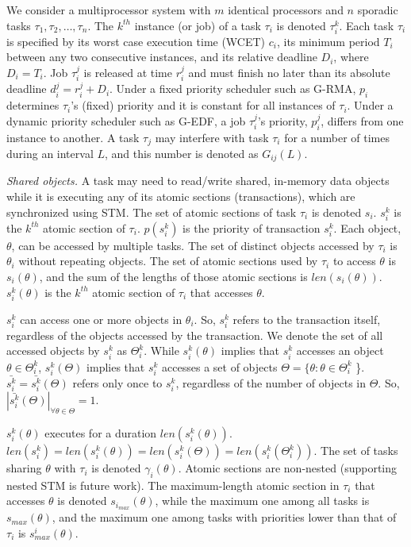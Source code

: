 \documentclass[twocolumn]{article}
\begin{document}
We consider a multiprocessor system with $m$ identical processors and $n$ sporadic tasks $\tau_1, \tau_2,\ldots, \tau_n$. The $k^{th}$ instance (or job) of a task $\tau_i$ is denoted $\tau_i^k$. Each task $\tau_i$ is specified by its worst case execution time (WCET) $c_i$, its minimum period $T_i$ between any two consecutive instances, and its relative deadline $D_i$, where $D_i=T_i$. Job $\tau_i^j$ is released at time $r_i^j$ and must finish no later than its absolute deadline $d_i^j=r_i^j+D_i$. Under a fixed priority scheduler such as G-RMA, $p_i$ determines $\tau_i$'s (fixed) priority and it is constant for all instances of $\tau_i$. Under a dynamic priority scheduler such as G-EDF, a job $\tau_i^j$'s priority, $p_i^j$, differs from one instance to another. 
A task $\tau_j$ may interfere with task $\tau_i$ for a number of times during an interval $L$, and this number is denoted as $G_{ij}(L)$. 


\textit{Shared objects.}
 A task may need to read/write shared, in-memory data objects while it is executing any of its atomic sections (transactions), which are synchronized using STM. 
The set of atomic sections of task $\tau_i$ is denoted $s_i$. $s_i^k$ is the $k^{th}$ atomic section of $\tau_i$. $p(s_i^k)$ is the priority of transaction $s_i^k$. Each object, $\theta$, can be accessed by multiple tasks. The set of distinct objects accessed by $\tau_i$ is $\theta_i$ without repeating objects.
The set of atomic sections used by $\tau_i$ to access $\theta$ is $s_i(\theta)$, and the sum of the lengths of those atomic sections is $len(s_i(\theta))$. $s_i^k(\theta)$ is the $k^{th}$ atomic section of $\tau_i$ that accesses $\theta$.

 $s_i^k$ can access one or more objects in $\theta_i$. So, $s_i^k$ refers to the transaction itself, regardless of the objects accessed by the transaction. We denote the set of all accessed objects by $s_i^k$ as $\Theta_i^k$. While $s_i^k(\theta)$ implies that $s_i^k$ accesses an object $\theta \in \Theta_i^k$, $s_i^k(\Theta)$ implies that $s_i^k$ accesses a set of objects $\Theta=\{\theta : \theta \in \Theta_i^k$ \}. $\bar{s_i^k}=\bar{s_i^k}(\Theta)$ refers only once to $s_i^k$, regardless of the number of objects in $\Theta$. So, $|\bar{s_i^k}(\Theta)|_{\forall \theta \in \Theta}=1$.

 $s_i^k(\theta)$  executes for a duration $len(s_i^k(\theta))$. $len(s_i^k)=len(s_i^k(\theta))=len(s_i^k(\Theta))=len(s_i^k(\Theta_i^k))$. The set of tasks sharing $\theta$ with $\tau_i$ is denoted $\gamma_i(\theta)$. Atomic sections are non-nested (supporting nested STM is future work). The maximum-length atomic section in $\tau_i$ that accesses $\theta$ is denoted $s_{i_{max}} (\theta)$, while the maximum one among all tasks is $s_{max} (\theta)$, and the maximum one among tasks with priorities lower than that of $\tau_i$ is $s_{max}^i (\theta)$.
\end{document}
